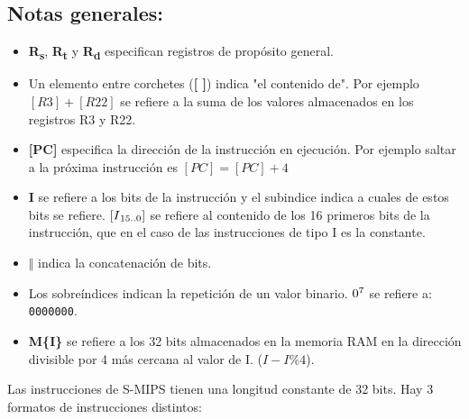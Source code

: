 \documentclass[letterpaper,11pt]{scrartcl}
\begin{document}
\subsection*{Notas generales:}
\begin{itemize}
    \item{ \textbf{R\textsubscript{s}}, \textbf{R\textsubscript{t}} y \textbf{R\textsubscript{d}} especifican registros de propósito general.}
    \item{ Un elemento entre corchetes (\textbf{[ ]}) indica "el contenido de". Por ejemplo $[R3] + [R22]$ se refiere a 
    la suma de los valores almacenados en los registros R3 y R22.}
    \item{ \textbf{[PC]} especifica la dirección de la instrucción en ejecución. Por ejemplo saltar a la próxima instrucción es 
    $[PC] = [PC] + 4$ }
    \item \textbf{I} se refiere a los bits de la instrucción y el subindice indica a cuales de estos bits se refiere. $[I\textsubscript{15..0}]$ 
    se refiere al contenido de los 16 primeros bits de la instrucción, que en el caso de las instrucciones de tipo I es la constante.
    \item \textbf{ $\Vert$ }  indica la concatenación de bits.
    \item Los sobreíndices indican la repetición de un valor binario. $0\textsuperscript{7}$ se refiere a: \verb|0000000|.
    \item \textbf{M\{I\}} se refiere a los 32 bits almacenados en la memoria RAM en la dirección divisible por 4
    más cercana al valor de I. ($I-I\%4$).
\end{itemize}

Las instrucciones de S-MIPS tienen una longitud constante de 32 bits. Hay 3 formatos de
instrucciones distintos:
\end{document}
